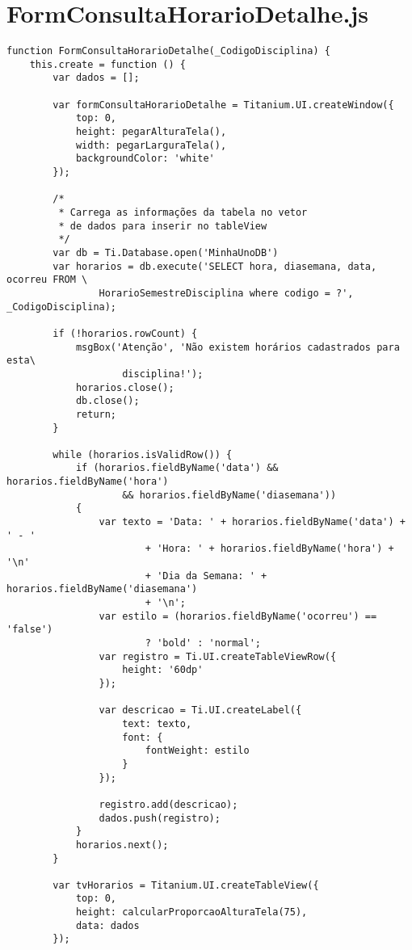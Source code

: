 \section{FormConsultaHorarioDetalhe.js}
\begin{lstlisting}
function FormConsultaHorarioDetalhe(_CodigoDisciplina) {
    this.create = function () {
        var dados = [];

        var formConsultaHorarioDetalhe = Titanium.UI.createWindow({
            top: 0,
            height: pegarAlturaTela(),
            width: pegarLarguraTela(),
            backgroundColor: 'white'
        });

        /*
         * Carrega as informações da tabela no vetor
         * de dados para inserir no tableView       
         */
        var db = Ti.Database.open('MinhaUnoDB')
        var horarios = db.execute('SELECT hora, diasemana, data, ocorreu FROM \
                HorarioSemestreDisciplina where codigo = ?', _CodigoDisciplina);

        if (!horarios.rowCount) {
            msgBox('Atenção', 'Não existem horários cadastrados para esta\
                    disciplina!');
            horarios.close();
            db.close();
            return;
        }

        while (horarios.isValidRow()) {
            if (horarios.fieldByName('data') && horarios.fieldByName('hora')
                    && horarios.fieldByName('diasemana'))
            {
                var texto = 'Data: ' + horarios.fieldByName('data') + ' - ' 
                        + 'Hora: ' + horarios.fieldByName('hora') + '\n' 
                        + 'Dia da Semana: ' + horarios.fieldByName('diasemana') 
                        + '\n';
                var estilo = (horarios.fieldByName('ocorreu') == 'false')
                        ? 'bold' : 'normal';
                var registro = Ti.UI.createTableViewRow({
                    height: '60dp'
                });

                var descricao = Ti.UI.createLabel({
                    text: texto,
                    font: {
                        fontWeight: estilo
                    }
                });

                registro.add(descricao);
                dados.push(registro);
            }
            horarios.next();
        }

        var tvHorarios = Titanium.UI.createTableView({
            top: 0,
            height: calcularProporcaoAlturaTela(75),
            data: dados
        });


\end{lstlisting}
